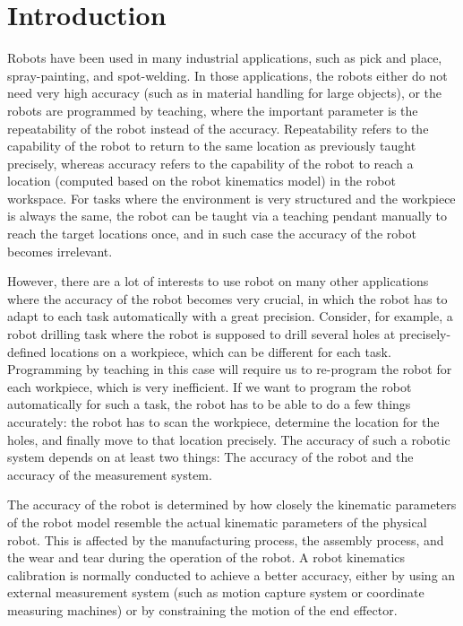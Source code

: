 \section{Introduction}
\label{sec:introduction}

Robots have been used in many industrial applications, such as pick and place, spray-painting, and spot-welding. In those applications, the robots either do not need very high accuracy (such as in material handling for large objects), or the robots are programmed by teaching, where the important parameter is the repeatability of the robot instead of the accuracy. Repeatability refers to the capability of the robot to return to the same location as previously taught precisely, whereas accuracy refers to the capability of the robot to reach a location (computed based on the robot kinematics model) in the robot workspace. For tasks where the environment is very structured and the workpiece is always the same, the robot can be taught via a teaching pendant manually to reach the target locations once, and in such case the accuracy of the robot becomes irrelevant. 

However, there are a lot of interests to use robot on many other applications where the accuracy of the robot becomes very crucial, in which the robot has to adapt to each task automatically with a great precision. Consider, for example, a robot drilling task where the robot is supposed to drill several holes at precisely-defined locations on a workpiece, which can be different for each task. Programming by teaching in this case will require us to re-program the robot for each workpiece, which is very inefficient. If we want to program the robot automatically for such a task, the robot has to be able to do a few things accurately: the robot has to scan the workpiece, determine the location for the holes, and finally
move to that location precisely. The accuracy of such a robotic system depends on at least two things: The accuracy of the robot and the accuracy of the measurement system. 

The accuracy of the robot is determined by how closely the kinematic parameters of the robot model resemble the actual kinematic parameters of the physical robot. This is affected by the manufacturing process, the assembly process, and the wear and tear during the operation of the robot. A robot kinematics calibration is normally conducted to achieve a better accuracy, either by using an external measurement system (such as motion capture system or coordinate measuring machines) or by constraining the motion of the end effector.

